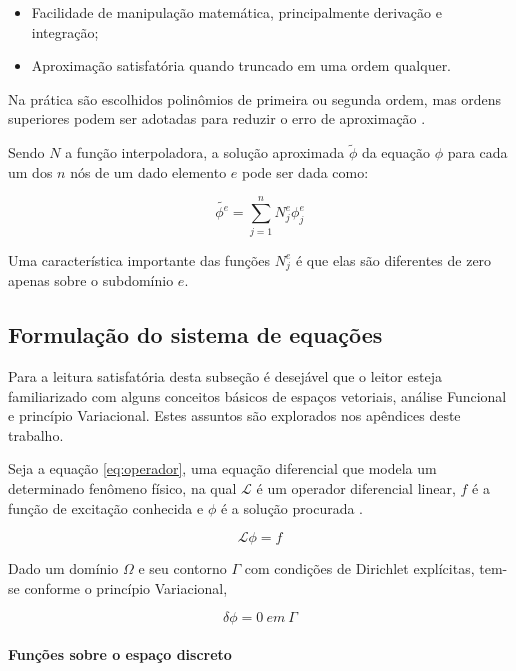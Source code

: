 \begin{itemize}  
\item Facilidade de manipulação matemática, principalmente derivação e integração;
\item Aproximação satisfatória quando truncado em uma ordem qualquer.
\end{itemize}

Na prática são escolhidos polinômios de primeira ou segunda ordem, mas ordens superiores podem ser adotadas para reduzir o erro de aproximação \citep[p. 32]{jin}.

Sendo $N$ a função interpoladora, a solução aproximada $\tilde{\phi}$ da equação $\phi$ para cada um dos $n$ nós de um dado elemento $e$ pode ser dada como:

 \begin{equation}
 	\label{eq:interpol}
		\tilde{\phi^e} = \sum_{j=1}^{n}{N_j^e \phi_j^e}
 \end{equation}

Uma característica importante das funções $N_j^e$ é que elas são diferentes de zero apenas sobre o subdomínio $e$.


\subsection{Formulação do sistema de equações}
Para a leitura satisfatória desta subseção é desejável que o leitor esteja familiarizado com alguns conceitos básicos de espaços vetoriais, análise Funcional e princípio Variacional. Estes assuntos são explorados nos apêndices deste trabalho.

Seja a equação \ref{eq:operador}, uma equação diferencial que modela um determinado fenômeno físico, na qual $\mathcal{L}$ é um operador diferencial linear, $f$ é a função de excitação conhecida e $\phi$ é a solução procurada \citep[p. 20]{jin}\citep[p. 24]{volakis}.

 \begin{equation}
 	\label{eq:operador}
	\mathcal{L} \phi = f
 \end{equation}
 
Dado um domínio $\Omega$ e seu contorno $\Gamma$ com condições de Dirichlet explícitas, tem-se conforme o princípio Variacional, 

 \begin{equation}
 	\label{eq:varPhi}
	\delta \phi = 0 \ em \ \Gamma
 \end{equation}

\paragraph{Funções sobre o espaço discreto \\}

